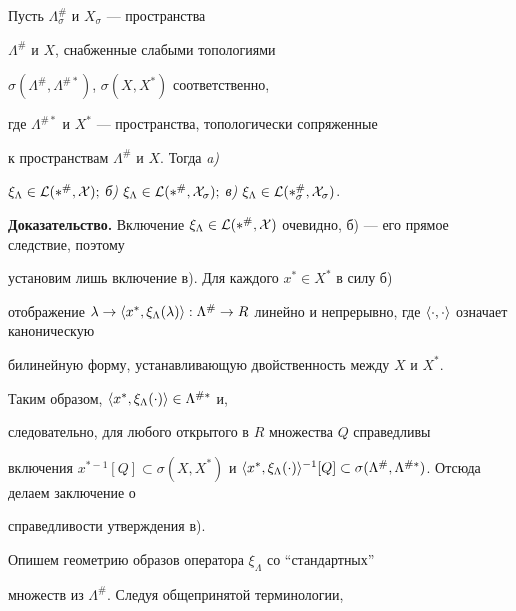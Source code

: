 \begin{lem} 


Пусть $\Lambda^{\#}_\sigma$ и $X_\sigma$ --- пространства 


$\Lambda^{\#}$ и $X$, снабженные слабыми топологиями 


$\sigma(\Lambda^{\#},\Lambda^{\# *})$, $\sigma(X,X^*)$ соответственно, 


где $\Lambda^{\# *}$ и $X^*$ --- пространства, топологически сопряженные 


к пространствам $\Lambda^{\#}$ и $X$. Тогда {\em a)} 


$\xi_\Lambda\in\cal L(\Lambda^{\#},X);$ {\em б)} $\xi_\Lambda\in\cal 


L(\Lambda^{\#},X_\sigma);$ {\em в)} $\xi_\Lambda\in\cal 


L(\Lambda^{\#}_\sigma,X_\sigma)$. 


\end{lem} 


 


{\bf Доказательство.} Включение $\xi_\Lambda\in \cal 


L(\Lambda^{\#},X)$ очевидно, б) --- его прямое следствие, поэтому 


установим лишь включение в). Для каждого $x^*\in X^*$ в силу б) 


отображение $\lambda\to\la x^*,\xi_\Lambda(\lambda)\ra:\Lambda^{\#}\to 


R$ линейно и непрерывно, где $\la\cdot,\cdot\ra$ означает каноническую 


билинейную форму, устанавливающую двойственность между $X$ и $X^*$. 


Таким образом, $\langle x^*,\xi_\Lambda(\cdot)\rangle\in\Lambda^{\# *}$ и, 


следовательно, для любого открытого в $R$ множества $Q$ справедливы 


включения $x^{*-1}[Q]\subset \sigma(X,X^*)$ и $\la 


x^*,\xi_\Lambda(\cdot)\ra^{-1}[Q]\subset 


\sigma(\Lambda^{\#},\Lambda^{\# *})$. Отсюда делаем заключение о 


справедливости утверждения в). 


 


Опишем геометрию образов оператора $\xi_\Lambda$ со ``стандартных'' 


множеств из $\Lambda^{\#}$. Следуя общепринятой терминологии, 


